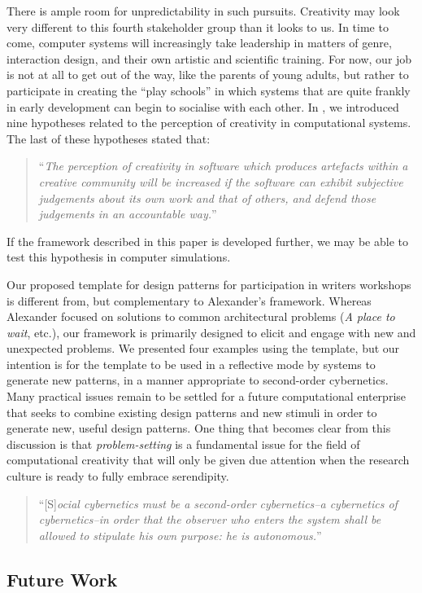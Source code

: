 There is ample room for unpredictability in such pursuits.  Creativity
may look very different to this fourth stakeholder group than it looks
to us.  In time to come, computer systems will increasingly take
leadership in matters of genre, interaction design, and their own
artistic and scientific training.  For now, our job is not at all to
get out of the way, like the parents of young adults, but rather to
participate in creating the ``play schools'' in which systems that are
quite frankly in early development can begin to socialise with each
other.
%
In \cite{stakeholder-groups-bookchapter}, we introduced nine
hypotheses related to the perception of creativity in computational
systems. 
The last of these hypotheses stated that:
\begin{quote}
``\emph{The perception of creativity in software which produces
  artefacts within a creative community will be increased if the
  software can exhibit subjective judgements about its own work and
  that of others, and defend those judgements in an accountable
  way.}''~\cite{stakeholder-groups-bookchapter}
\end{quote}
If the framework described in this paper is developed further, we may
be able to test this hypothesis in computer simulations.

Our proposed template for design patterns for participation in writers
workshops is different from, but complementary to Alexander's
framework.  Whereas Alexander focused on solutions to common
architectural problems (\emph{A place to wait}, etc.), our framework
is primarily designed to elicit and engage with new and unexpected
problems.  We presented four examples using the template, but our
intention is for the template to be used in a reflective mode by
systems to generate new patterns, in a manner appropriate to
second-order cybernetics.  Many practical issues remain to be settled
for a future computational enterprise that seeks to combine existing
design patterns and new stimuli in order to generate new, useful
design patterns.  One thing that becomes clear from this discussion is
that \emph{problem-setting} is a fundamental issue for the field of
computational creativity that will only be given due attention when
the research culture is ready to fully embrace serendipity.

\begin{quote}
``[S]\emph{ocial cybernetics must be a second-order cybernetics--a
    cybernetics of cybernetics--in order that the observer who enters
    the system shall be allowed to stipulate his own purpose: he is
    autonomous.}'' \cite[p. 286]{von2003essays}
\end{quote}

\subsection{Future Work} \label{sec:futurework}
